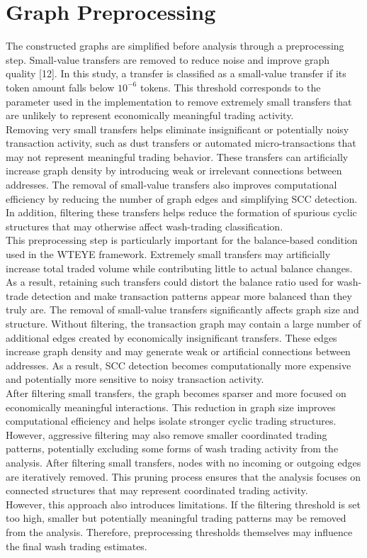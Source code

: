 \documentclass[language=english,thesis=bachelor,nosecondtitle,faculty=cb,onesided,12pt]{hsmw-thesis}
\begin{document}
	\section{Graph Preprocessing}
The constructed graphs are simplified before analysis through a preprocessing step. Small-value transfers are removed to reduce noise and improve graph quality [12]. In this study, a transfer is classified as a small-value transfer if its token amount falls below $10^{-6}$ tokens. This threshold corresponds to the parameter used in the implementation to remove extremely small transfers that are unlikely to represent economically meaningful trading activity.\\
Removing very small transfers helps eliminate insignificant or potentially noisy transaction activity, such as dust transfers or automated micro-transactions that may not represent meaningful trading behavior. These transfers can artificially increase graph density by introducing weak or irrelevant connections between addresses.
The removal of small-value transfers also improves computational efficiency by reducing the number of graph edges and simplifying SCC detection. In addition, filtering these transfers helps reduce the formation of spurious cyclic structures that may otherwise affect wash-trading classification.\\
This preprocessing step is particularly important for the balance-based condition used in the WTEYE framework. Extremely small transfers may artificially increase total traded volume while contributing little to actual balance changes. As a result, retaining such transfers could distort the balance ratio used for wash-trade detection and make transaction patterns appear more balanced than they truly are.
The removal of small-value transfers significantly affects graph size and structure. Without filtering, the transaction graph may contain a large number of additional edges created by economically insignificant transfers. These edges increase graph density and may generate weak or artificial connections between addresses. As a result, SCC detection becomes computationally more expensive and potentially more sensitive to noisy transaction activity.\\
After filtering small transfers, the graph becomes sparser and more focused on economically meaningful interactions. This reduction in graph size improves computational efficiency and helps isolate stronger cyclic trading structures. However, aggressive filtering may also remove smaller coordinated trading patterns, potentially excluding some forms of wash trading activity from the analysis.
After filtering small transfers, nodes with no incoming or outgoing edges are iteratively removed. This pruning process ensures that the analysis focuses on connected structures that may represent coordinated trading activity.\\
However, this approach also introduces limitations. If the filtering threshold is set too high, smaller but potentially meaningful trading patterns may be removed from the analysis. Therefore, preprocessing thresholds themselves may influence the final wash trading estimates.\\
\end{document}
